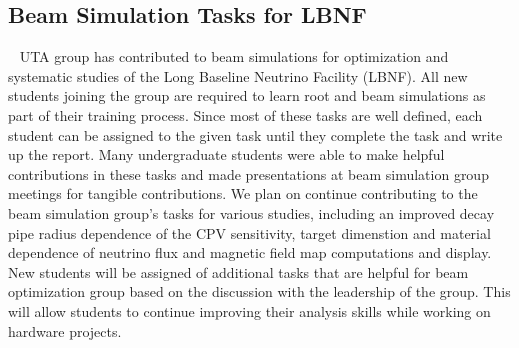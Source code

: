 \subsection {Beam Simulation Tasks for LBNF}~\label{sec:dune-beam-sim}
UTA group has contributed to beam simulations for optimization and systematic studies of the Long Baseline Neutrino Facility (LBNF).
All new students joining the group are required to learn root and beam simulations as part of their training process.  
Since most of these tasks are well defined, each student can be assigned to the given task until they complete the task and 
write up the report.
Many undergraduate students were able to make helpful contributions in these tasks and made presentations at beam simulation group 
meetings for tangible contributions.
We plan on continue contributing to the beam simulation group's tasks for various studies, including an improved decay pipe 
radius dependence of the CPV sensitivity, target dimenstion and material dependence of neutrino flux and magnetic field map 
computations and display.
New students will be assigned of additional tasks that are helpful for beam optimization group based on the discussion with the
leadership of the group.
This will allow students to continue improving their analysis skills while working on hardware projects.
